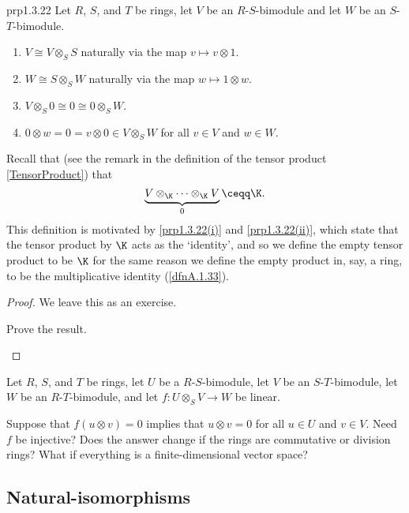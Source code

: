 \begin{prp}{}{prp1.3.22}
	Let $R$, $S$, and $T$ be rings, let $V$ be an $R$-$S$-bimodule and let $W$ be an $S$-$T$-bimodule.
	\begin{enumerate}
		\item \label{prp1.3.22(i)}$V\cong V\otimes _SS$ naturally via the map $v\mapsto v\otimes 1$.
		\item \label{prp1.3.22(ii)}$W\cong S\otimes _SW$ naturally via the map $w\mapsto 1\otimes w$.
		\item \label{prp1.3.22(iii)}$V\otimes _S0\cong 0\cong 0\otimes _SW$.
		\item \label{prp1.3.22(iv)}$0\otimes w=0=v\otimes 0\in V\otimes _SW$ for all $v\in V$ and $w\in W$.
	\end{enumerate}
	\begin{rmk}
		Recall that (see the remark in the definition of the tensor product \cref{TensorProduct}) that
		\begin{equation}
			\underbrace{V\otimes _{\K}\cdots \otimes _{\K}V}_0\ceqq \K .
		\end{equation}
		This definition is motivated by \cref{prp1.3.22(i)} and \cref{prp1.3.22(ii)}, which state that the tensor product by $\K$ acts as the `identity', and so we define the empty tensor product to be $\K$ for the same reason we define the empty product in, say, a ring, to be the multiplicative identity (\cref{dfnA.1.33}).
	\end{rmk}
	\begin{proof}
		We leave this as an exercise.
		\begin{exr}[breakable=false]{}{}
			Prove the result.
		\end{exr}
	\end{proof}
\end{prp}

\begin{exr}{}{}
	Let $R$, $S$, and $T$ be rings, let $U$ be a $R$-$S$-bimodule, let $V$ be an $S$-$T$-bimodule, let $W$ be an $R$-$T$-bimodule, and let $f\colon U\otimes _SV\rightarrow W$ be linear.
	
	Suppose that $f(u\otimes v)=0$ implies that $u\otimes v=0$ for all $u\in U$ and $v\in V$.  Need $f$ be injective?  Does the answer change if the rings are commutative or division rings?  What if everything is a finite-dimensional vector space?
\end{exr}

\subsection{Natural-isomorphisms}

